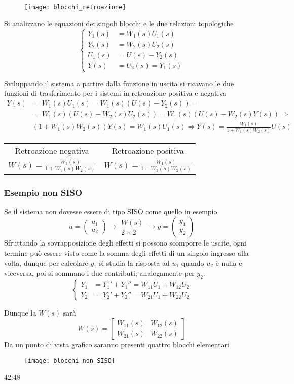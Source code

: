 \begin{figure}[h]
\centering
\texttt{[image: blocchi\_retroazione]}
\end{figure}

Si analizzano le equazioni dei singoli blocchi e le due relazioni topologiche
$$
\left\{\begin{aligned}
Y_1(s) &= W_1(s) U_1(s) \\
Y_2(s) &= W_2(s) U_2(s) \\
U_1(s) &= U(s) - Y_2(s) \\
Y(s) &= U_2(s) = Y_1(s)
\end{aligned}\right.
$$

Sviluppando il sistema a partire dalla funzione in uscita si ricavano le due
funzioni di trasferimento per i sistemi in retroazione positiva e negativa
$$
\begin{aligned}
Y(s) & = W_1(s) U_1(s) = W_1(s) (U(s) - Y_2(s)) =\\
&=
W_1(s) (U(s) - W_2(s)U_2(s)) = W_1(s)(U(s)-W_2(s)Y(s)) \Rightarrow \\
&(1+W_1(s)W_2(s))Y(s) = W_1(s) U_1(s) \Rightarrow
Y(s) = \frac{W_1(s)}{1+W_1(s)W_2(s)}U(s)
\end{aligned}
$$
\begin{table}[h]
\centering
\begin{tabular}{c|c}
Retroazione negativa & Retroazione positiva \\
$W(s) = \frac{W_1(s)}{1+W_1(s)W_2(s)}$ &
$W(s) = \frac{W_1(s)}{1-W_1(s)W_2(s)}$
\end{tabular}
\end{table}

\subsubsection{Esempio non SISO}
Se il sistema non dovesse essere di tipo SISO come quello in esempio
$$
u=\begin{pmatrix}
u_1 \\ u_2
\end{pmatrix} \rightarrow
\begin{matrix}W(s)\\2\times2
\end{matrix}
\rightarrow y = \begin{pmatrix}
y_1 \\ y_2
\end{pmatrix}
$$
Sfruttando la sovrapposizione degli effetti si possono scomporre le uscite,
ogni termine può essere visto come la somma degli effetti di un singolo
ingresso alla volta, dunque per calcolare $y_1$ si studia la risposta ad $u_1$
quando $u_2$ è nulla e viceversa, poi si sommano i due contributi; analogamente
per $y_2$.
$$\left\{\begin{aligned}
Y_1 &= Y_1' + Y_1'' = W_{11}U_1 + W_{12}U_2\\
Y_2 & = Y_2' + Y_2'' = W_{21}U_1 + W_{22}U_2
\end{aligned}\right.$$

Dunque la $W(s)$ sarà
$$
W(s) = \begin{bmatrix}
W_{11}(s) & W_{12}(s) \\
W_{21}(s) & W_{22}(s)
\end{bmatrix}
$$
Da un punto di vista grafico saranno presenti quattro blocchi elementari
\begin{figure}[h]
\centering
\texttt{[image: blocchi\_non\_SISO]}
\end{figure}
42:48
